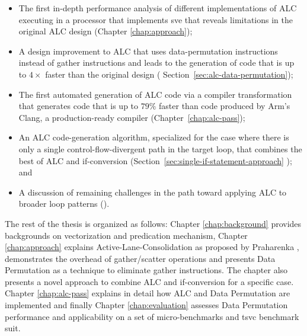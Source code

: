 \begin{itemize}

\item The first in-depth performance analysis of different implementations of ALC executing in a processor that implements \acrshort{sve}  that reveals limitations in the original ALC design (Chapter \ref{chap:approach});
\item A design improvement to ALC that uses data-permutation instructions instead of gather instructions and leads to the generation of code that is up to $4\times$ faster than the original design ( Section~\ref{sec:alc-data-permutation});
\item The first automated generation of ALC code via a  compiler transformation that generates code that is up to $79\%$ faster than \ifconverted code produced by Arm's Clang, a production-ready compiler (Chapter~\ref{chap:alc-pass});
\item An ALC code-generation algorithm, specialized for the case where there is only a single control-flow-divergent path in the target loop, that combines the best of ALC and if-conversion (Section~\ref{sec:single-if-statement-approach} ); and 
\item A discussion of remaining challenges in the path toward applying ALC to broader loop patterns ().
\end{itemize}



The rest of the thesis is organized as follows: Chapter \ref{chap:background} provides backgrounds on vectorization and predication mechanism, Chapter \ref{chap:approach} explains Active-Lane-Consolidation as proposed by Praharenka \etal, demonstrates the overhead of gather/scatter operations and presents Data Permutation as a technique to eliminate gather instructions. The chapter also presents a novel approach to combine ALC and if-conversion for a specific case. Chapter \ref{chap:alc-pass} explains in detail how ALC and Data Permutation are implemented and finally Chapter \ref{chap:evaluation} assesses Data Permutation performance and applicability on a set of micro-benchmarks and \acrshort{tsvc}  benchmark suit.

